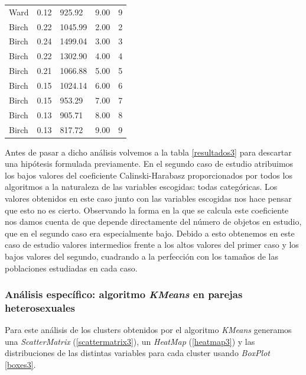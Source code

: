 \documentclass[11pt,a4paper]{article}
\begin{document}
\begin{table}[]
\begin{tabular}{lllll}
			Ward      & 0.12  & 925.92            & 9.00       & 9           \\
			Birch     & 0.22  & 1045.99           & 2.00       & 2           \\
			Birch     & 0.24  & 1499.04           & 3.00       & 3           \\
			Birch     & 0.22  & 1302.90           & 4.00       & 4           \\
			Birch     & 0.21  & 1066.88           & 5.00       & 5           \\
			Birch     & 0.15  & 1024.14           & 6.00       & 6           \\
			Birch     & 0.15  & 953.29            & 7.00       & 7           \\
			Birch     & 0.13  & 905.71            & 8.00       & 8           \\
			Birch     & 0.13  & 817.72            & 9.00       & 9          
		\end{tabular}
	\end{table}
	
	Antes de pasar a dicho análisis volvemos a la tabla \ref{resultados3} para descartar una hipótesis formulada previamente. En el segundo caso de estudio atribuimos los bajos valores del coeficiente Calinski-Harabasz proporcionados por todos los algoritmos a la naturaleza de las variables escogidas: todas categóricas. Los valores obtenidos en este caso junto con las variables escogidas nos hace pensar que esto no es cierto. Observando la forma en la que se calcula este coeficiente nos damos cuenta de que depende directamente del número de objetos en estudio, que en el segundo caso era especialmente bajo. Debido a esto obtenemos en este caso de estudio valores intermedios frente a los altos valores del primer caso y los bajos valores del segundo, cuadrando a la perfección con los tamaños de las poblaciones estudiadas en cada caso. 

	\subsubsection{Análisis específico: algoritmo \emph{KMeans} en parejas heterosexuales}
	
	Para este análisis de los clusters obtenidos por el algoritmo \emph{KMeans} generamos una \emph{ScatterMatrix} (\ref{scattermatrix3}), un \emph{HeatMap} (\ref{heatmap3}) y las distribuciones de las distintas variables para cada cluster usando \emph{BoxPlot} \ref{boxes3}. \\
	
\end{document}
